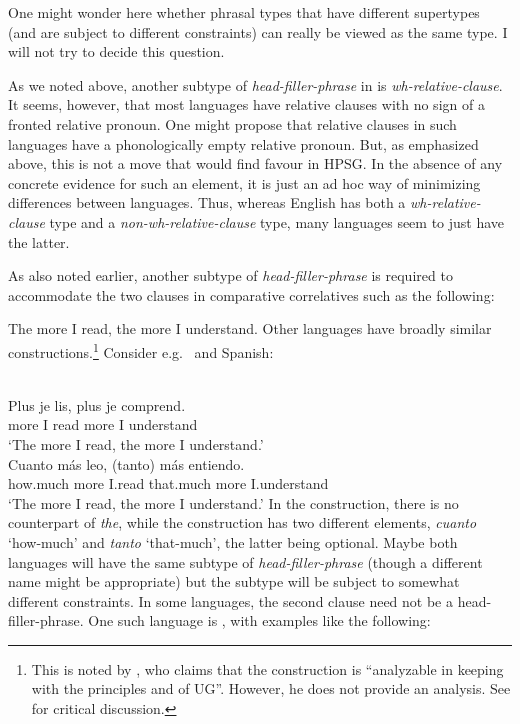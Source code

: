 \documentclass[output=paper]{langsci/langscibook}
\begin{document}
\ea\label{ex:borsley:4.16}
\z
%
One might wonder here whether phrasal types that have different supertypes (and
are subject to different constraints) can really be viewed as the same type. I
will not try to decide this question.

As we noted above, another subtype of \emph{head-filler-phrase} in  is
\emph{wh-relative-clause}. It seems, however, that most languages have relative
clauses with no sign of a fronted relative pronoun. One might propose that
relative clauses in such languages have a phonologically empty relative
pronoun. But, as emphasized above, this is not a move that would find favour in
\gls{HPSG}. In the absence of any concrete evidence for such an element, it is
just an ad hoc way of minimizing differences between languages. Thus, whereas
English has both a \emph{wh-relative-clause} type and a
\emph{non-wh-relative-clause} type, many languages seem to just have the
latter.

As also noted earlier, another subtype of \emph{head-filler-phrase} is required
to accommodate the two clauses in comparative correlatives such as the
following:

\ea\label{ex:borsley:4.17}
    The more I read, the more I understand.
\z
%
Other languages have broadly similar constructions.\footnote{This is noted by
    \citet[498]{denDikken2005b}, who claims that the construction is
    \enquote{analyzable in keeping with the principles and  of
    \gls{UG}}.  However, he does not provide an analysis. See
\textcite{AbeBor2008} for critical discussion.} Consider e.g.\  and
Spanish:

\ea\label{ex:borsley:4.18}\\
    \gll Plus je lis, plus je comprend.\\
            more I read more I understand\\
    \glt    \enquote*{The more I read, the more I understand.}
\ex \label{ex:borsley:4.19}\\
    \gll Cuanto más leo, (tanto) más entiendo.\\
            how.much more I.read that.much more I.understand\\
    \glt    \enquote*{The more I read, the more I understand.}
\z
%
In the  construction, there is no counterpart of \emph{the}, while
the  construction has two different elements, \emph{cuanto} ‘how-much’
and \emph{tanto} ‘that-much’, the latter being optional. Maybe both languages
will have the same subtype of \emph{head-filler-phrase} (though a different
name might be appropriate) but the subtype will be subject to somewhat
different constraints. In some languages, the second clause need not be a
head-filler-phrase. One such language is , with examples like the
following:
\end{document}
